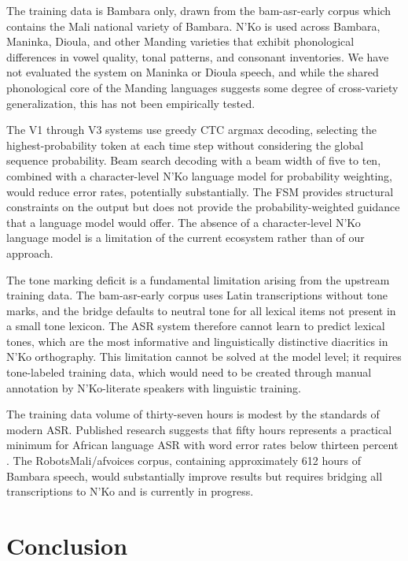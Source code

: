 \documentclass[11pt]{article}
\newcommand{\nko}{N'Ko}
\begin{document}
The training data is Bambara only, drawn from the bam-asr-early corpus which contains the Mali national variety of Bambara. \nko{} is used across Bambara, Maninka, Dioula, and other Manding varieties that exhibit phonological differences in vowel quality, tonal patterns, and consonant inventories. We have not evaluated the system on Maninka or Dioula speech, and while the shared phonological core of the Manding languages suggests some degree of cross-variety generalization, this has not been empirically tested.

The V1 through V3 systems use greedy CTC argmax decoding, selecting the highest-probability token at each time step without considering the global sequence probability. Beam search decoding with a beam width of five to ten, combined with a character-level \nko{} language model for probability weighting, would reduce error rates, potentially substantially. The FSM provides structural constraints on the output but does not provide the probability-weighted guidance that a language model would offer. The absence of a character-level \nko{} language model is a limitation of the current ecosystem rather than of our approach.

The tone marking deficit is a fundamental limitation arising from the upstream training data. The bam-asr-early corpus uses Latin transcriptions without tone marks, and the bridge defaults to neutral tone for all lexical items not present in a small tone lexicon. The ASR system therefore cannot learn to predict lexical tones, which are the most informative and linguistically distinctive diacritics in \nko{} orthography. This limitation cannot be solved at the model level; it requires tone-labeled training data, which would need to be created through manual annotation by \nko{}-literate speakers with linguistic training.

The training data volume of thirty-seven hours is modest by the standards of modern ASR. Published research suggests that fifty hours represents a practical minimum for African language ASR with word error rates below thirteen percent \cite{data_scaling_2024}. The RobotsMali/afvoices corpus, containing approximately 612 hours of Bambara speech, would substantially improve results but requires bridging all transcriptions to \nko{} and is currently in progress.

\section{Conclusion}
\label{sec:conclusion}
\end{document}
